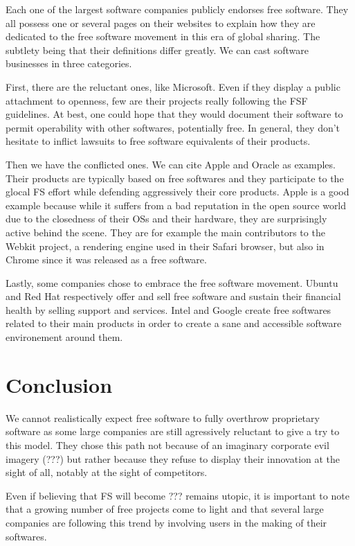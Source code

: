 \documentclass[12pt]{article}
\begin{document}
Each one of the largest software companies publicly endorses free
software. They all possess one or several pages on their websites to
explain how they are dedicated to the free software movement in this
era of global sharing. The subtlety being that their definitions
differ greatly. We can cast software businesses in three categories.

First, there are the reluctant ones, like Microsoft. Even if they
display a public attachment to openness, few are their projects really
following the FSF guidelines. At best, one could hope that they would
document their software to permit operability with other softwares,
potentially free. In general, they don't hesitate to inflict lawsuits
to free software equivalents of their products.

Then we have the conflicted ones. We can cite Apple and Oracle as
examples. Their products are typically based on free softwares and
they participate to the glocal FS effort while defending aggressively
their core products. Apple is a good example because while it suffers
from a bad reputation in the open source world due to the closedness
of their OSs and their hardware, they are surprisingly active behind the scene. They are for example the
main contributors to the Webkit project, a rendering engine used in their Safari browser, but also in Chrome since it was released
as a free software.

Lastly, some companies chose to embrace the free software
movement. Ubuntu and Red Hat respectively offer and sell free software
and sustain their financial health by selling support and
services. Intel and Google create free softwares related to their main
products in order to create a sane and accessible software
environement around them.

\section*{Conclusion}

We cannot realistically expect free software to fully overthrow proprietary software
as some large companies are still agressively reluctant to give a try to this model.
They chose this path not because of an imaginary corporate evil imagery (???) but rather because
they refuse to display their innovation at the sight of all, notably at the sight of competitors.

Even if believing that FS will become ??? remains utopic, it is important to note
that a growing number of free projects come to light and that several large companies
are following this trend by involving users in the making of their softwares.
\end{document}
